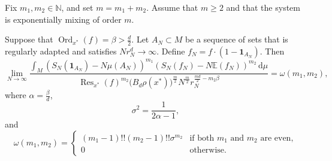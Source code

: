 \documentclass[10pt,a4paper]{amsart}
\def\one{{\mathbf{1}}}
\newcommand{\E}{\mathbb{E}}
\newcommand{\Ord}{\operatorname{Ord}}
\newcommand{\Res}{\operatorname{Res}}
\renewcommand{\d}{\, \text{d}}
\begin{document}
\begin{proposition}\label{momentprop}
Fix $m_1,m_2\in \mathbb N$, and set $m=m_1+m_2.$ Assume that $m\geq2$ and that the system is exponentially mixing of order $m$.

Suppose that $\Ord_{x^*}(f)=\beta>\frac{d}{2}$. Let $A_N\subset M$ be a sequence of sets that is regularly adapted and satisfies $N r_N^{d} \rightarrow \infty$. Define $f_N=f \cdot \left(1-\one_{A_N}\right).$ Then
\begin{equation}\label{momentclaim}
\lim_{N\rightarrow\infty} \frac{\int_M \left(S_N(\one_{A_N}) - N \mu(A_N) \right)^{m_1} \left(S_N(f_N) - N \E( f_N)\right)^{m_2}\d\mu}{\Res_{x^*}(f)^{m_2}\bigl(B_d \rho(x^*)\bigr)^{\frac{m}{2}} N^{\frac{m}{2}} r_N^{\frac{md}{2}-m_2\beta }}=\omega(m_1,m_2),
\end{equation}
where $\alpha=\frac{\beta}{d}$,
\begin{equation*}
\sigma^2= \frac{1}{2\alpha-1},
\end{equation*}
and \begin{equation*}
\omega(m_1,m_2)= \begin{cases}
(m_1 - 1)!! (m_2-1)!! \sigma^{m_2} & \text{if both } m_1 \text{ and } m_2 \text{ are even},\\
0 & \text{otherwise}.
\end{cases}
\end{equation*}
\end{proposition}
\end{document}
